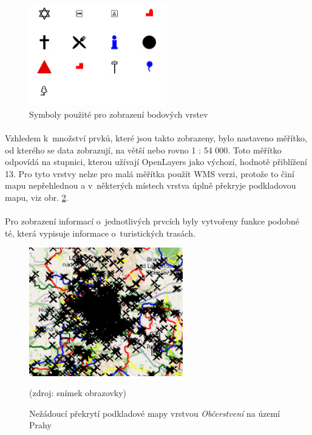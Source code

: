 \documentclass[11pt,a4paper,titlepage,oneside]{book}
\begin{document}

		\begin{figure}[!h]
			\begin{center}
				\includegraphics[width=6cm]{obrazky/toulavej/symbols.png}
				\caption{Symboly použité pro zobrazení bodových vrstev}
				\label{fig:symboly}
			\end{center}
		\end{figure}	

			\paragraph{}Vzhledem k~množství prvků, které jsou takto zobrazeny, bylo nastaveno měřítko, od kterého se data zobrazují, na větší nebo rovno 1 : 54 000. Toto měřítko odpovídá na stupnici, kterou užívají OpenLayers jako výchozí, hodnotě přiblížení 13. Pro tyto vrstvy nelze pro malá měřítka použít \ac{WMS} verzi, protože to činí mapu nepřehlednou a v~některých místech vrstva úplně překryje podkladovou mapu, viz obr. \ref{fig:food}.
		
		\paragraph{}Pro zobrazení informací o~jednotlivých prvcích byly vytvořeny funkce podobné té, která vypisuje informace o~turistických trasách.



\begin{figure}[!h]
			\begin{center}
				\includegraphics[width=6.7cm]{obrazky/toulavej/food.png}
				\caption{Nežádoucí překrytí podkladové mapy vrstvou \textit{Občerstvení} na území Prahy}
				\label{fig:food}
				(zdroj: snímek obrazovky)
			\end{center}
		\end{figure}	
\end{document}
